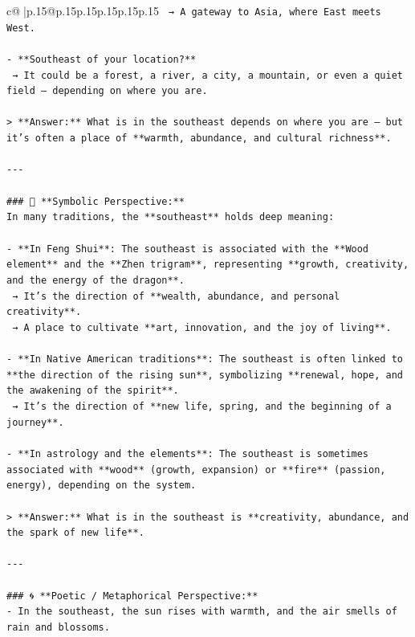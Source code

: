 \documentclass{article}
\begin{document}
{\begin{supertabular}{c@{$\;$}|p{.15\linewidth}@{}p{.15\linewidth}p{.15\linewidth}p{.15\linewidth}p{.15\linewidth}p{.15\linewidth}}
{{{\texttt{  → A gateway to Asia, where East meets West.} \\
\\ 
\texttt{{-} **Southeast of your location?**  } \\
\texttt{  → It could be a forest, a river, a city, a mountain, or even a quiet field — depending on where you are.} \\
\\ 
\texttt{> **Answer:** What is in the southeast depends on where you are — but it’s often a place of **warmth, abundance, and cultural richness**.} \\
\\ 
\texttt{{-}{-}{-}} \\
\\ 
\texttt{\#\#\# 🌌 **Symbolic Perspective:**} \\
\texttt{In many traditions, the **southeast** holds deep meaning:} \\
\\ 
\texttt{{-} **In Feng Shui**: The southeast is associated with the **Wood element** and the **Zhen trigram**, representing **growth, creativity, and the energy of the dragon**.  } \\
\texttt{  → It’s the direction of **wealth, abundance, and personal creativity**.  } \\
\texttt{  → A place to cultivate **art, innovation, and the joy of living**.} \\
\\ 
\texttt{{-} **In Native American traditions**: The southeast is often linked to **the direction of the rising sun**, symbolizing **renewal, hope, and the awakening of the spirit**.  } \\
\texttt{  → It’s the direction of **new life, spring, and the beginning of a journey**.} \\
\\ 
\texttt{{-} **In astrology and the elements**: The southeast is sometimes associated with **wood** (growth, expansion) or **fire** (passion, energy), depending on the system.} \\
\\ 
\texttt{> **Answer:** What is in the southeast is **creativity, abundance, and the spark of new life**.} \\
\\ 
\texttt{{-}{-}{-}} \\
\\ 
\texttt{\#\#\# 🌀 **Poetic / Metaphorical Perspective:**} \\
\texttt{{-} In the southeast, the sun rises with warmth, and the air smells of rain and blossoms.  } \\
}}}
\end{supertabular}}
\end{document}
